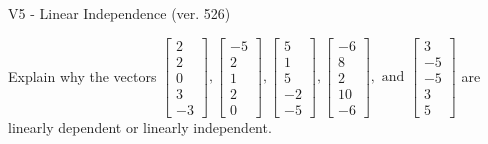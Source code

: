 \begin{exercise}
  \begin{exerciseTitle}V5 - Linear Independence (ver. 526)\end{exerciseTitle}
  \begin{exerciseStatement}
    Explain why the vectors \(\left[\begin{array}{r}
2 \\
2 \\
0 \\
3 \\
-3
\end{array}\right] , \left[\begin{array}{r}
-5 \\
2 \\
1 \\
2 \\
0
\end{array}\right] , \left[\begin{array}{r}
5 \\
1 \\
5 \\
-2 \\
-5
\end{array}\right] , \left[\begin{array}{r}
-6 \\
8 \\
2 \\
10 \\
-6
\end{array}\right] , \text{ and } \left[\begin{array}{r}
3 \\
-5 \\
-5 \\
3 \\
5
\end{array}\right]\) are linearly dependent or linearly independent.	



\end{exerciseStatement}
\end{exercise}
